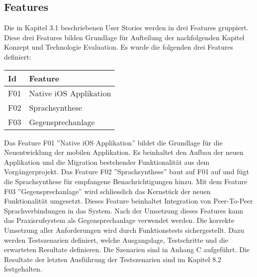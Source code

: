\subsection{Features}

Die in Kapitel 3.1 beschriebenen User Stories werden in drei Features gruppiert.
Diese drei Features bilden Grundlage für Aufteilung der nachfolgenden Kapitel Konzept und Technologie Evaluation.
Es wurde die folgenden drei Features definiert:

\begin{table}[h]
    \centering
    \begin{tabular}{|l|p{15cm}|}
        \hline
        \textbf{Id} & \textbf{Feature}                        \\
        \hline
        F01         & Native iOS Applikation                 \\
        \hline
        F02         & Sprachsynthese                          \\
        \hline
        F03         & Gegensprechanlage                       \\
        \hline
    \end{tabular}\label{tab:features}
\end{table}

Das Feature F01 ''Native iOS Applikation'' bildet die Grundlage für die Neuentwicklung der mobilen Applikation.
Es beinhaltet den Aufbau der neuen Applikation und die Migration bestehender Funktionalität aus dem Vorgängerprojekt.
Das Feature F02 ''Sprachsynthese'' baut auf F01 auf und fügt die Sprachsynthese für empfangene Benachrichtigungen hinzu.
Mit dem Feature F03 ''Gegensprechanlage'' wird schliesslich das Kernstück der neuen Funktionalität umgesetzt.
Dieses Feature beinhaltet Integration von Peer-To-Peer Sprachverbindungen in das System.
Nach der Umsetzung dieses Features kann das Praxisrufsystem als Gegensprechanlage verwendet werden.
Die korrekte Umsetzung aller Anforderungen wird durch Funktionstests sichergestellt.
Dazu werden Testszenarien definiert, welche Ausgangslage, Testschritte und die erwarteten Resultate definieren.
Die Szenarien sind in Anhang C aufgeführt.
Die Resultate der letzten Ausführung der Testszenarien sind im Kapitel 8.2 festgehalten.

\clearpage
